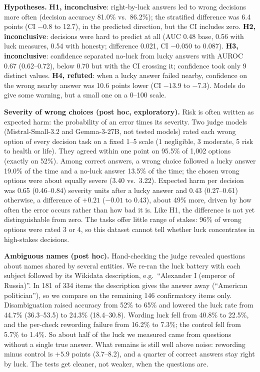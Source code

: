 \documentclass[10pt]{article}
\begin{document}
\textbf{Hypotheses.} \textbf{H1, inconclusive}: right-by-luck answers led to wrong decisions more often (decision accuracy 81.0\% vs.\ 86.2\%); the stratified difference was 6.4 points (CI $-0.8$ to 12.7), in the predicted direction, but the CI includes zero. \textbf{H2, inconclusive}: decisions were hard to predict at all (AUC 0.48 base, 0.56 with luck measures, 0.54 with honesty; difference 0.021, CI $-0.050$ to 0.087). \textbf{H3, inconclusive}: confidence separated no-luck from lucky answers with AUROC 0.67 (0.62--0.72), below 0.70 but with the CI crossing it; confidence took only 9 distinct values. \textbf{H4, refuted}: when a lucky answer failed nearby, confidence on the wrong nearby answer was 10.6 points lower (CI $-13.9$ to $-7.3$). Models do give some warning, but a small one on a 0--100 scale.

\textbf{Severity of wrong choices (post hoc, exploratory).} Risk is often written as expected harm: the probability of an error times its severity. Two judge models (Mistral-Small-3.2 and Gemma-3-27B, not tested models) rated each wrong option of every decision task on a fixed 1--5 scale (1 negligible, 3 moderate, 5 risk to health or life). They agreed within one point on 95.5\% of 1{,}002 options (exactly on 52\%). Among correct answers, a wrong choice followed a lucky answer 19.0\% of the time and a no-luck answer 13.5\% of the time; the chosen wrong options were about equally severe (3.40 vs.\ 3.22). Expected harm per decision was 0.65 (0.46--0.84) severity units after a lucky answer and 0.43 (0.27--0.61) otherwise, a difference of $+0.21$ ($-0.01$ to 0.43), about 49\% more, driven by how often the error occurs rather than how bad it is. Like H1, the difference is not yet distinguishable from zero. The tasks offer little range of stakes: 96\% of wrong options were rated 3 or 4, so this dataset cannot tell whether luck concentrates in high-stakes decisions.

\textbf{Ambiguous names (post hoc).} Hand-checking the judge revealed questions about names shared by several entities. We re-ran the luck battery with each subject followed by its Wikidata description, e.g.\ ``Alexander I (emperor of Russia)''. In 181 of 334 items the description gives the answer away (``American politician''), so we compare on the remaining 146 confirmatory items only. Disambiguation raised accuracy from 52\% to 65\% and lowered the luck rate from 44.7\% (36.3--53.5) to 24.3\% (18.4--30.8). Wording luck fell from 40.8\% to 22.5\%, and the per-check rewording failure from 16.2\% to 7.3\%; the control fell from 5.7\% to 1.4\%. So about half of the luck we measured came from questions without a single true answer. What remains is still well above noise: rewording minus control is $+5.9$ points (3.7--8.2), and a quarter of correct answers stay right by luck. The tests get cleaner, not weaker, when the questions are.
\end{document}
